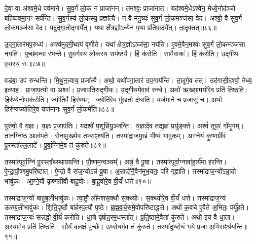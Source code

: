 दे॒वा वा अ॑श्वमे॒धे पव॑माने।
सु॒व॒र्गं लो॒कं न प्राजा॑नन्।
तमश्वः॒ प्राजा॑नात्।
यद॑श्वमे॒धे\-ऽश्वे॑न॒ मेध्ये॒नोद॑ञ्चो बहिष्पवमा॒नꣳ सर्प॑न्ति।
सु॒व॒र्गस्य॑ लो॒कस्य॒ प्रज्ञा᳚त्यै।
न वै म॑नु॒ष्यः॑ सुव॒र्गं लो॒कमञ्ज॑सा वेद।
अश्वो॒ वै सु॑व॒र्गं लो॒कमञ्ज॑सा वेद।
यदु॑द्गा॒तोद्गाये᳚त्।
यथा क्षे᳚त्रज्ञो॒\-ऽन्येन॑ प॒था प्र॑तिपा॒दये᳚त्।
ता॒दृक्तत्॥८६॥

उ॒द्गा॒तार॑मप॒रुध्य॑।
अश्व॑मुद्गी॒थाय॑ वृणीते।
यथा᳚ क्षेत्र॒ज्ञो\-ऽञ्ज॑सा॒ नय॑ति।
ए॒वमे॒वैन॒मश्वः॑ सुव॒र्गं लो॒कमञ्ज॑सा नयति।
पुच्छ॑म॒न्वा र॑भन्ते।
सु॒व॒र्गस्य॑ लो॒कस्य॒ सम॑ष्ट्यै।
हिं क॑रोति।
सामै॒वाकः॑।
हिं क॑रोति।
उ॒द्गी॒थ ए॒वास्य॒ सः॥८७॥

वड॑बा॒ उप॑ रुन्धन्ति।
मि॒थु॒न॒त्वाय॒ प्रजा᳚त्यै।
अथो॒ यथो॑पगा॒तार॑ उप॒गाय॑न्ति।
ता॒दृगे॒व तत्।
उद॑गासी॒दश्वो॒ मेध्य॒ इत्या॑ह।
प्रा॒जा॒प॒त्यो वा अश्वः॑।
प्र॒जा\-प॑तिरुद्गी॒थः।
उ॒द्गी॒थमे॒वाव॑ रुन्धे।
अथो॑ ऋख्सा॒मयो॑रे॒व प्रति॑ तिष्ठति।
हिर॑ण्येनो॒पाक॑रोति।
ज्योति॒र्वै हिर॑ण्यम्।
ज्योति॑रे॒व मु॑ख॒तो द॑धाति।
यज॑माने च प्र॒जासु॑ च।
अथो॒ हिर॑ण्यज्योतिरे॒व यज॑मानः सुव॒र्गं लो॒कमे॑ति॥८८॥\anuvakamend[तथ्स उ॒पाक॑रोति च॒त्वारि॑ च]

पुरु॑षो॒ वै य॒ज्ञः।
य॒ज्ञः प्र॒जा\-प॑तिः।
यदश्वे॑ प॒शून्नि॑यु॒ञ्जन्ति॑।
य॒ज्ञादे॒व तद्य॒ज्ञं प्रयु॑ङ्क्ते।
अश्वं॑ तूप॒रं गो॑मृ॒गम्।
तान॑ग्नि॒ष्ठ आल॑भते।
से॒ना॒मु॒खमे॒व तथ्सꣴश्य॑ति।
तस्मा᳚द्राजमु॒खं भी॒ष्मं भावु॑कम्।
आ॒ग्ने॒यं कृ॒ष्णग्री॑वं पु॒रस्ता᳚ल्ल॒लाटे᳚।
पू॒र्वा॒ग्निमे॒व तं कु॑रुते॥८९॥

तस्मा᳚त्पूर्वा॒ग्निं पु॒रस्ता᳚थ्स्थापयन्ति।
पौ॒ष्णम॒न्वञ्चम्᳚।
अन्नं॒ वै पू॒षा।
तस्मा᳚त्पूर्वा॒ग्नावा॑हा॒र्य॑मा ह॑रन्ति।
ऐ॒न्द्रा॒पौ॒ष्णमु॒परि॑ष्टात्।
ऐ॒न्द्रो वै रा॑ज॒न्यो\-ऽन्नं॑ पू॒षा।
अ॒न्नाद्ये॑नै॒वैन॑मुभ॒यतः॒ परि॑ गृह्णाति।
तस्मा᳚द्राज॒न्यो᳚\-ऽन्ना॒दो भावु॑कः।
आ॒ग्ने॒यौ कृ॒ष्णग्री॑वौ बाहु॒वोः।
बा॒हु॒वोरे॒व वी॒र्यं॑ धत्ते॥९०॥

तस्मा᳚द्राज॒न्यो॑ बाहुब॒लीभावु॑कः।
त्वा॒ष्ट्रौ लो॑मशस॒क्थौ स॒क्थ्योः।
स॒क्थ्योरे॒व वी॒र्यं॑ धत्ते।
तस्मा᳚द्राज॒न्य॑ ऊरुब॒लीभावु॑कः।
शि॒ति॒पृ॒ष्ठौ बा॑र्\mbox{}हस्प॒त्यौ पृ॒ष्ठे।
ब्र॒ह्म॒व॒र्च॒समे॒वोपरि॑ष्टाद्धत्ते।
अथो॑ क॒वचे॑ ए॒वैते अ॒भितः॒ पर्यू॑हते।
तस्मा᳚द्राज॒न्यः॑ सन्न॑द्धो वी॒र्यं॑ करोति।
धा॒त्रे पृ॑षोद॒रम॒धस्ता᳚त्।
प्र॒ति॒ष्ठामे॒वैतां कु॑रुते।
अथो॑ इ॒यं वै धा॒ता।
अ॒स्यामे॒व प्रति॑ तिष्ठति।
सौ॒र्यं ब॒लक्षं॒ पुच्छे᳚।
उ॒थ्से॒धमे॒व तं कु॑रुते।
तस्मा॑दुथ्से॒धं भ॒ये प्र॒जा अ॒भिसꣴश्र॑यन्ति॥९१॥\anuvakamend[कु॒रु॒ते॒ ध॒त्ते॒ कु॒रु॒ते॒ पञ्च॑ च]




\clearpage
{}
\setcounter{anuvakam}{0}


